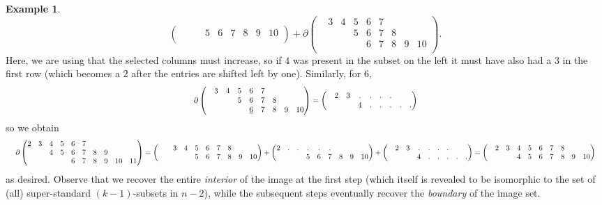 \documentclass[11pt]{article}
\theoremstyle{definition}
\newtheorem{example}[theo]{Example}
\numberwithin{equation}{section}
\numberwithin{equation}{section}
\newcommand{\ul}[1]{\underline{#1}}
\newcommand\scalemath[2]{\scalebox{#1}{\mbox{\ensuremath{\displaystyle #2}}}}
\begin{document}
\begin{example}
\[{\begin{pmatrix}
      &  &  & 5 & 6 & 7 & 8 & 9 & 10 \\
\end{pmatrix}
+ \partial \begin{pmatrix}
        & 3 & 4 & 5 & 6 & 7  \\
        &   &   & 5 & 6 & 7 & 8 \\
        &   &   &   & 6 & 7 & 8 & 9 & 10 \\
\end{pmatrix}.
} \]
Here, we are using that the selected columns must increase, so if $4$ was present in the subset on the left it must have also had a $3$ in the first row (which becomes a $2$ after the entries are shifted left by one).  Similarly, for $6$,
\[ \scalemath{0.8}{
\partial \begin{pmatrix}
        & 3 & 4 & 5 & 6 & 7  \\
        &   &   & 5 & 6 & 7 & 8 \\
        &   &   &   & {\ul 6} & 7 & 8 & 9 & 10 \\
\end{pmatrix}
= \begin{pmatrix}
        & 2 & 3 & . & . & . & . \\
        &   &   & 4 & .  & . & . & . & . \\
\end{pmatrix}
} \]
so we obtain
\[ \scalemath{0.75}{
\partial 
\begin{pmatrix}
    {\ul 2} & 3 & 4 & 5 & 6 & 7  \\
    &   & 4 & 5 & 6 & 7 & 8 & 9 \\
    &   &   &   & 6 & 7 & 8 & 9 & 10 & 11 \\
\end{pmatrix}
= \begin{pmatrix}
    &   & 3 & 4 & 5 & 6 & 7 & 8 \\
    &   &   &   & 5 & 6 & 7 & 8 & 9 & 10 \\
\end{pmatrix}
+
\begin{pmatrix}
    2 & . & . & . & . & .  \\
      &  &  & 5 & 6 & 7 & 8 & 9 & 10 \\
\end{pmatrix}
+ \begin{pmatrix}
        & 2 & 3 & . & . & . & . \\
        &   &   & 4 & .  & . & . & . & . \\
\end{pmatrix}
= \begin{pmatrix}
    & 2 & 3 & 4 & 5 & 6 & 7 & 8 \\
    &   &   & 4 & 5 & 6 & 7 & 8 & 9 & 10 \\
\end{pmatrix}
} \]
as desired.  Observe that we recover the entire {\em interior} of the image at the first step (which itself is revealed to be isomorphic to the set of (all) super-standard $(k-1)$-subsets in $n-2$), while the subsequent steps eventually recover the {\em boundary} of the image set.
\end{example}
\end{document}
